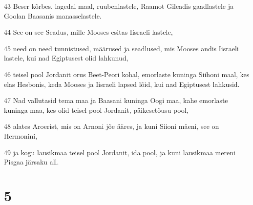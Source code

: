 \par 43 Beser kõrbes, lagedal maal, ruubenlastele, Raamot Gileadis gaadlastele ja Goolan Baasanis manasselastele.
\par 44 See on see Seadus, mille Mooses esitas Iisraeli lastele,
\par 45 need on need tunnistused, määrused ja seadlused, mis Mooses andis Iisraeli lastele, kui nad Egiptusest olid lahkunud,
\par 46 teisel pool Jordanit orus Beet-Peori kohal, emorlaste kuninga Siihoni maal, kes elas Hesbonis, keda Mooses ja Iisraeli lapsed lõid, kui nad Egiptusest lahkusid.
\par 47 Nad vallutasid tema maa ja Baasani kuninga Oogi maa, kahe emorlaste kuninga maa, kes olid teisel pool Jordanit, päikesetõusu pool,
\par 48 alates Aroerist, mis on Arnoni jõe ääres, ja kuni Siioni mäeni, see on Hermonini,
\par 49 ja kogu lausikmaa teisel pool Jordanit, ida pool, ja kuni lausikmaa mereni Pisgaa järsaku all.

\chapter{5}

